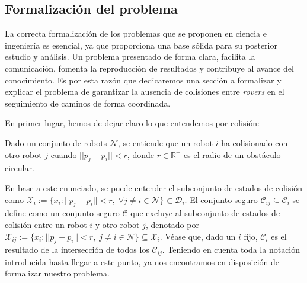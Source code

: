 \subsection{Formalización del problema}

La correcta formalización de los problemas que se proponen en ciencia e ingeniería es esencial, ya que proporciona una base sólida para su posterior estudio y análisis. Un problema presentado de forma clara, facilita la comunicación, fomenta la reproducción de resultados y contribuye al avance del conocimiento. Es por esta razón que dedicaremos una sección a formalizar y explicar el problema de garantizar la ausencia de colisiones entre \textit{rovers} en el seguimiento de caminos de forma coordinada.

En primer lugar, hemos de dejar claro lo que entendemos por colisión:

\vspace{0.1cm}

\begin{definition}
    Dado un conjunto de robots $\mathcal{N}$, se entiende que un robot $i$ ha colisionado con otro robot $j$ cuando $||p_j - p_i|| < r$, donde $r \in \mathds{R}^+$ es el radio de un obstáculo circular.
\end{definition}

En base a este enunciado, se puede entender el subconjunto de estados de colisión como $\mathcal{X}_i := \{ x_i : ||p_j - p_i|| < r, \; \forall j \neq i \in \mathcal{N}\}\subset \mathcal{D}_i$. El conjunto seguro $\mathcal{C}_{ij} \subseteq \mathcal{C}_i$ se define como un conjunto seguro $\mathcal{C}$ que excluye al subconjunto de estados de colisión entre un robot $i$ y otro robot $j$, denotado por $\mathcal{X}_{ij} := \{ x_i : ||p_j - p_i|| < r, \; j \neq i \in \mathcal{N}\} \subseteq \mathcal{X}_i$. Véase que, dado un $i$ fijo, $\mathcal{C}_i$ es el resultado de la intersección de todos los $\mathcal{C}_{ij}$. Teniendo en cuenta toda la notación introducida hasta llegar a este punto, ya nos encontramos en disposición de formalizar nuestro problema.

\newpage

